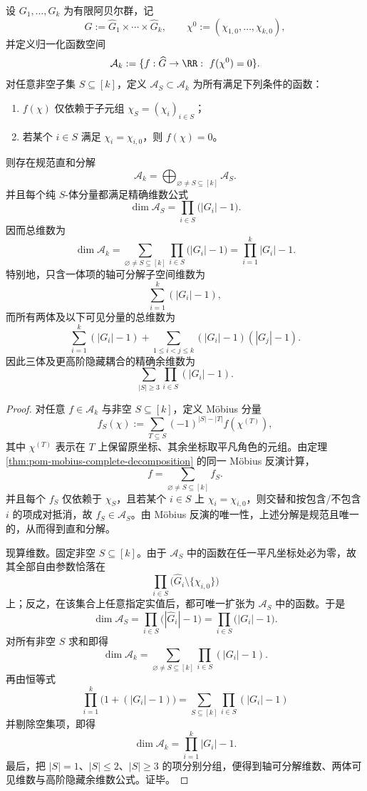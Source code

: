 \begin{theorem}\label{thm:pom-cross-anom-mobius-anova-dimension-theory}
设 \(G_1,\dots,G_k\) 为有限阿贝尔群，记
\[
\widehat G:=\widehat G_1\times\cdots\times\widehat G_k,
\qquad
\chi^0:=(\chi_{1,0},\dots,\chi_{k,0}),
\]
并定义归一化函数空间
\[
\mathcal A_k:=\{f:\widehat G\to\RR:\ f(\chi^0)=0\}.
\]
对任意非空子集 \(S\subseteq[k]\)，定义 \(\mathcal A_S\subset \mathcal A_k\) 为所有满足下列条件的函数：
\begin{enumerate}
  \item \(f(\chi)\) 仅依赖于子元组 \(\chi_S=(\chi_i)_{i\in S}\)；
  \item 若某个 \(i\in S\) 满足 \(\chi_i=\chi_{i,0}\)，则 \(f(\chi)=0\)。
\end{enumerate}
则存在规范直和分解
\[
\boxed{
\mathcal A_k=\bigoplus_{\varnothing\neq S\subseteq[k]}\mathcal A_S.
}
\]
并且每个纯 \(S\)-体分量都满足精确维数公式
\[
\boxed{
\dim \mathcal A_S=\prod_{i\in S}\bigl(|G_i|-1\bigr).
}
\]
因而总维数为
\[
\boxed{
\dim\mathcal A_k
=
\sum_{\varnothing\neq S\subseteq[k]}\prod_{i\in S}\bigl(|G_i|-1\bigr)
=
\prod_{i=1}^{k}|G_i|-1.
}
\]
特别地，只含一体项的轴可分解子空间维数为
\[
\sum_{i=1}^{k}(|G_i|-1),
\]
而所有两体及以下可见分量的总维数为
\[
\sum_{i=1}^{k}(|G_i|-1)
+
\sum_{1\le i<j\le k}(|G_i|-1)(|G_j|-1).
\]
因此三体及更高阶隐藏耦合的精确余维数为
\[
\sum_{|S|\ge 3}\prod_{i\in S}(|G_i|-1).
\]
\end{theorem}
\begin{proof}
对任意 \(f\in\mathcal A_k\) 与非空 \(S\subseteq[k]\)，定义 Möbius 分量
\[
f_S(\chi)
:=
\sum_{T\subseteq S}(-1)^{|S|-|T|}f(\chi^{(T)}),
\]
其中 \(\chi^{(T)}\) 表示在 \(T\) 上保留原坐标、其余坐标取平凡角色的元组。由定理 \ref{thm:pom-mobius-complete-decomposition} 的同一 Möbius 反演计算，
\[
f=\sum_{\varnothing\neq S\subseteq[k]} f_S.
\]
并且每个 \(f_S\) 仅依赖于 \(\chi_S\)，且若某个 \(i\in S\) 上 \(\chi_i=\chi_{i,0}\)，则交替和按包含/不包含 \(i\) 的项成对抵消，故 \(f_S\in \mathcal A_S\)。由 Möbius 反演的唯一性，上述分解是规范且唯一的，从而得到直和分解。

现算维数。固定非空 \(S\subseteq[k]\)。由于 \(\mathcal A_S\) 中的函数在任一平凡坐标处必为零，故其全部自由参数恰落在
\[
\prod_{i\in S}\bigl(\widehat G_i\setminus\{\chi_{i,0}\}\bigr)
\]
上；反之，在该集合上任意指定实值后，都可唯一扩张为 \(\mathcal A_S\) 中的函数。于是
\[
\dim \mathcal A_S=\prod_{i\in S}\bigl(|\widehat G_i|-1\bigr)
=
\prod_{i\in S}\bigl(|G_i|-1\bigr).
\]
对所有非空 \(S\) 求和即得
\[
\dim\mathcal A_k
=
\sum_{\varnothing\neq S\subseteq[k]}\prod_{i\in S}(|G_i|-1).
\]
再由恒等式
\[
\prod_{i=1}^{k}\bigl(1+(|G_i|-1)\bigr)
=
\sum_{S\subseteq[k]}\prod_{i\in S}(|G_i|-1)
\]
并剔除空集项，即得
\[
\dim\mathcal A_k=\prod_{i=1}^{k}|G_i|-1.
\]
最后，把 \(|S|=1\)、\(|S|\le 2\)、\(|S|\ge 3\) 的项分别分组，便得到轴可分解维数、两体可见维数与高阶隐藏余维数公式。证毕。
\end{proof}

